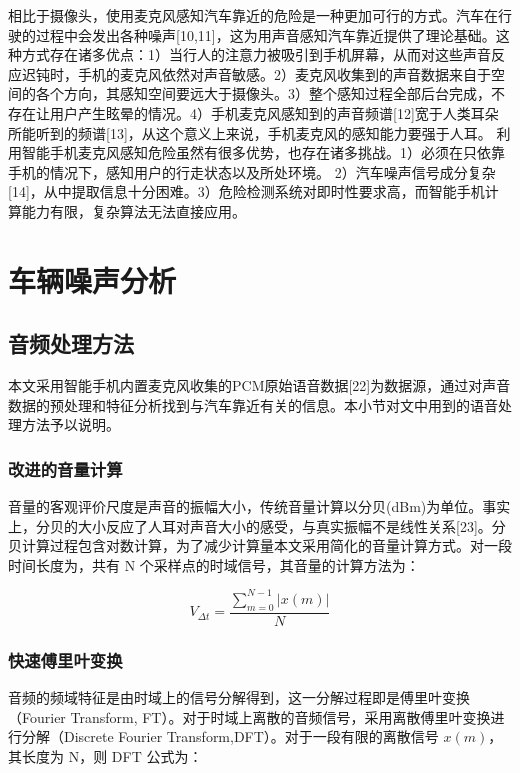 相比于摄像头，使用麦克风感知汽车靠近的危险是一种更加可行的方式。汽车在行驶的过程中会发出各种噪声[10,11]，这为用声音感知汽车靠近提供了理论基础。这种方式存在诸多优点：1）当行人的注意力被吸引到手机屏幕，从而对这些声音反应迟钝时，手机的麦克风依然对声音敏感。2）麦克风收集到的声音数据来自于空间的各个方向，其感知空间要远大于摄像头。3）整个感知过程全部后台完成，不存在让用户产生眩晕的情况。4）手机麦克风感知到的声音频谱[12]宽于人类耳朵所能听到的频谱[13]，从这个意义上来说，手机麦克风的感知能力要强于人耳。
利用智能手机麦克风感知危险虽然有很多优势，也存在诸多挑战。1）必须在只依靠手机的情况下，感知用户的行走状态以及所处环境。 2）汽车噪声信号成分复杂[14]，从中提取信息十分困难。3）危险检测系统对即时性要求高，而智能手机计算能力有限，复杂算法无法直接应用。






\section{车辆噪声分析}

\subsection{音频处理方法}
本文采用智能手机内置麦克风收集的PCM原始语音数据[22]为数据源，通过对声音数据的预处理和特征分析找到与汽车靠近有关的信息。本小节对文中用到的语音处理方法予以说明。

\subsubsection{改进的音量计算}
音量的客观评价尺度是声音的振幅大小，传统音量计算以分贝(dBm)为单位。事实上，分贝的大小反应了人耳对声音大小的感受，与真实振幅不是线性关系[23]。分贝计算过程包含对数计算，为了减少计算量本文采用简化的音量计算方式。对一段时间长度为，共有 N 个采样点的时域信号，其音量的计算方法为：

\begin{equation}
\label{equ:chap3:volume}
V_{\Delta t}= \frac{\sum_{m=0}^{N-1}\left | x\left ( m \right ) \right |}{N}
\end{equation}

\subsubsection{快速傅里叶变换}
音频的频域特征是由时域上的信号分解得到，这一分解过程即是傅里叶变换（Fourier Transform, FT）。对于时域上离散的音频信号，采用离散傅里叶变换进行分解（Discrete Fourier Transform,DFT）。对于一段有限的离散信号 $x(m)$，其长度为 N，则 DFT 公式为：




